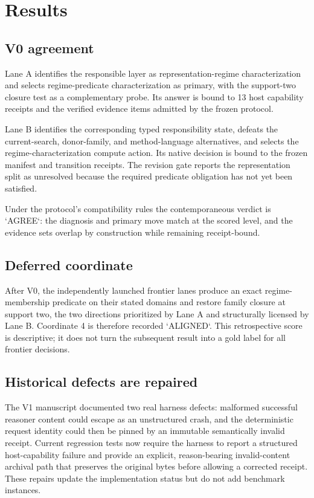 \section{Results}

\subsection{V0 agreement}
Lane A identifies the responsible layer as representation-regime characterization and selects regime-predicate characterization as primary, with the support-two closure test as a complementary probe. Its answer is bound to 13 host capability receipts and the verified evidence items admitted by the frozen protocol.

Lane B identifies the corresponding typed responsibility state, defeats the current-search, donor-family, and method-language alternatives, and selects the regime-characterization compute action. Its native decision is bound to the frozen manifest and transition receipts. The revision gate reports the representation split as unresolved because the required predicate obligation has not yet been satisfied.

Under the protocol's compatibility rules the contemporaneous verdict is `AGREE`: the diagnosis and primary move match at the scored level, and the evidence sets overlap by construction while remaining receipt-bound.

\subsection{Deferred coordinate}
After V0, the independently launched frontier lanes produce an exact regime-membership predicate on their stated domains and restore family closure at support two, the two directions prioritized by Lane A and structurally licensed by Lane B. Coordinate 4 is therefore recorded `ALIGNED`. This retrospective score is descriptive; it does not turn the subsequent result into a gold label for all frontier decisions.

\subsection{Historical defects are repaired}
The V1 manuscript documented two real harness defects: malformed successful reasoner content could escape as an unstructured crash, and the deterministic request identity could then be pinned by an immutable semantically invalid receipt. Current regression tests now require the harness to report a structured host-capability failure and provide an explicit, reason-bearing invalid-content archival path that preserves the original bytes before allowing a corrected receipt. These repairs update the implementation status but do not add benchmark instances.

